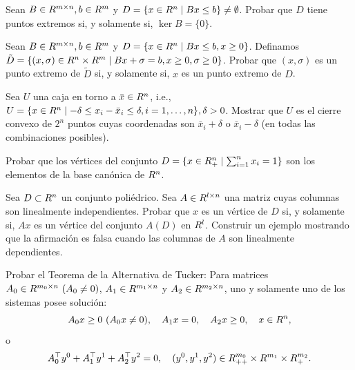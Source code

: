 \begin{exercise}\label{v1:ejer:3.2.24}
 Sean $B \in R^{m \times n}, b \in R^m$ y $D = \{ x \in R^n \mid Bx \le b \} \neq \emptyset$. Probar que $D$ tiene puntos extremos si, y solamente si, $\ker B = \{0\}$.
\end{exercise}

\begin{exercise}\label{v1:ejer:3.2.25}
 Sean $B \in R^{m \times n}, b \in R^m$ y $D = \{ x \in R^n \mid Bx \le b, x \ge 0 \}$. Definamos $\tilde{D} = \{ (x, \sigma) \in R^n \times R^m \mid Bx + \sigma = b, x \ge 0, \sigma \ge 0 \}$. Probar que $(x, \sigma)$ es un punto extremo de $\tilde{D}$ si, y solamente si, $x$ es un punto extremo de $D$.
\end{exercise}

\begin{exercise}\label{v1:ejer:3.2.26}
 Sea $U$ una caja en torno a $\bar{x} \in R^n$, i.e., $U = \{ x \in R^n \mid -\delta \le x_i - \bar{x}_i \le \delta, i=1,\dots,n \}, \delta > 0$. Mostrar que $U$ es el cierre convexo de $2^n$ puntos cuyas coordenadas son $\bar{x}_i + \delta$ o $\bar{x}_i - \delta$ (en todas las combinaciones posibles).
\end{exercise}

\begin{exercise}\label{v1:ejer:3.2.27}
 Probar que los vértices del conjunto $D = \{ x \in R_+^n \mid \sum_{i=1}^n x_i = 1 \}$ son los elementos de la base canónica de $R^n$.
\end{exercise}

\begin{exercise}\label{v1:ejer:3.2.28}
 Sea $D \subset R^n$ un conjunto poliédrico. Sea $A \in R^{l \times n}$ una matriz cuyas columnas son linealmente independientes. Probar que $x$ es un vértice de $D$ si, y solamente si, $Ax$ es un vértice del conjunto $A(D)$ en $R^l$. Construir un ejemplo mostrando que la afirmación es falsa cuando las columnas de $A$ son linealmente dependientes.
\end{exercise}


\begin{exercise}\label{v1:ejer:3.3.1}
 Probar el Teorema de la Alternativa de Tucker: Para matrices $A_0 \in R^{m_0 \times n} \ (A_0 \neq 0)$, $A_1 \in R^{m_1 \times n}$ y $A_2 \in R^{m_2 \times n}$, uno y solamente uno de los sistemas posee solución:
 \[
 A_0 x \ge 0 \ (A_0 x \neq 0), \quad A_1 x = 0, \quad A_2 x \ge 0, \quad x \in R^n,
 \]
 o
 \[
 A_0^\top y^0 + A_1^\top y^1 + A_2^\top y^2 = 0, \quad (y^0, y^1, y^2) \in R^{m_0}_{++} \times R^{m_1} \times R^{m_2}_+.
 \]
\end{exercise}

